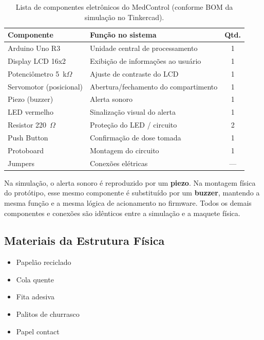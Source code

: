 \documentclass[11pt,a4paper]{article}
\begin{document}
\begin{table}[H]
\centering
\begin{tabularx}{\linewidth}{@{}l Y c@{}}
\toprule
\textbf{Componente} & \textbf{Função no sistema} & \textbf{Qtd.} \\
\midrule
Arduino Uno R3 & Unidade central de processamento & 1 \\
Display LCD 16x2 & Exibição de informações ao usuário & 1 \\
Potenciômetro 5~k$\Omega$ & Ajuste de contraste do LCD & 1 \\
Servomotor (posicional) & Abertura/fechamento do compartimento & 1 \\
Piezo (buzzer) & Alerta sonoro & 1 \\
LED vermelho & Sinalização visual do alerta & 1 \\
Resistor 220~$\Omega$ & Proteção do LED / circuito & 2 \\
Push Button & Confirmação de dose tomada & 1 \\
Protoboard & Montagem do circuito & 1 \\
Jumpers & Conexões elétricas & — \\
\bottomrule
\end{tabularx}
\caption{Lista de componentes eletrônicos do MedControl (conforme BOM da simulação no Tinkercad).}
\end{table}

\begin{infobox}
Na simulação, o alerta sonoro é reproduzido por um \textbf{piezo}. Na montagem física do protótipo, esse mesmo componente é substituído por um \textbf{buzzer}, mantendo a mesma função e a mesma lógica de acionamento no firmware. Todos os demais componentes e conexões são idênticos entre a simulação e a maquete física.
\end{infobox}

\subsection{Materiais da Estrutura Física}

\begin{itemize}[leftmargin=1.4em, itemsep=2pt]
  \item Papelão reciclado
  \item Cola quente
  \item Fita adesiva
  \item Palitos de churrasco
  \item Papel contact
\end{itemize}
\end{document}
